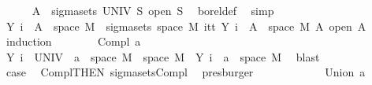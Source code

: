 \begin{isabellebody}
\ \ \ \ \isamarkupfalse%
\ {\isachardoublequoteopen}A\ {\isasymin}\ sigma{\isacharunderscore}{\kern0pt}sets\ UNIV\ {\isacharbraceleft}{\kern0pt}S{\isachardot}{\kern0pt}\ open\ S{\isacharbraceright}{\kern0pt}{\isachardoublequoteclose}\ \isamarkupfalse%
\ borel{\isacharunderscore}{\kern0pt}def\ \isamarkupfalse%
\ simp\isanewline
\ \ \ \ \isamarkupfalse%
\ {\isachardoublequoteopen}Y\ i\ {\isacharminus}{\kern0pt}{\isacharbackquote}{\kern0pt}\ A\ {\isasyminter}\ space\ M\ {\isasymin}\ sigma{\isacharunderscore}{\kern0pt}sets\ {\isacharparenleft}{\kern0pt}space\ M{\isacharparenright}{\kern0pt}\ {\isacharparenleft}{\kern0pt}{\isasymUnion}i{\isasymin}{\isacharbraceleft}{\kern0pt}tt{\isacharbraceright}{\kern0pt}{\isachardot}{\kern0pt}\ {\isacharbraceleft}{\kern0pt}Y\ i\ {\isacharminus}{\kern0pt}{\isacharbackquote}{\kern0pt}\ A\ {\isasyminter}\ space\ M\ {\isacharbar}{\kern0pt}A{\isachardot}{\kern0pt}\ open\ A{\isacharbraceright}{\kern0pt}{\isacharparenright}{\kern0pt}{\isachardoublequoteclose}\isanewline
\ \ \ \ \isamarkupfalse%
\ {\isacharparenleft}{\kern0pt}induction{\isacharparenright}{\kern0pt}\isanewline
\ \ \ \ \ \ \isamarkupfalse%
\ {\isacharparenleft}{\kern0pt}Compl\ a{\isacharparenright}{\kern0pt}\isanewline
\ \ \ \ \ \ \isamarkupfalse%
\ {\isachardoublequoteopen}Y\ i\ {\isacharminus}{\kern0pt}{\isacharbackquote}{\kern0pt}\ {\isacharparenleft}{\kern0pt}UNIV\ {\isacharminus}{\kern0pt}\ a{\isacharparenright}{\kern0pt}\ {\isasyminter}\ space\ M\ {\isacharequal}{\kern0pt}\ space\ M\ {\isacharminus}{\kern0pt}\ {\isacharparenleft}{\kern0pt}Y\ i\ {\isacharminus}{\kern0pt}{\isacharbackquote}{\kern0pt}\ a\ {\isasyminter}\ space\ M{\isacharparenright}{\kern0pt}{\isachardoublequoteclose}\ \isamarkupfalse%
\ blast\isanewline
\ \ \ \ \ \ \isamarkupfalse%
\ \isamarkupfalse%
\ {\isacharquery}{\kern0pt}case\ \isamarkupfalse%
\ Compl{\isacharparenleft}{\kern0pt}{}{\isacharparenright}{\kern0pt}{\isacharbrackleft}{\kern0pt}THEN\ sigma{\isacharunderscore}{\kern0pt}sets{\isachardot}{\kern0pt}Compl{\isacharbrackright}{\kern0pt}\ \isamarkupfalse%
\ presburger\isanewline
\ \ \ \ \isamarkupfalse%
\isanewline
\ \ \ \ \ \ \isamarkupfalse%
\ {\isacharparenleft}{\kern0pt}Union\ a{\isacharparenright}{\kern0pt}\isanewline
\ \ \ \ \ \ \isamarkupfalse%

\end{isabellebody}
